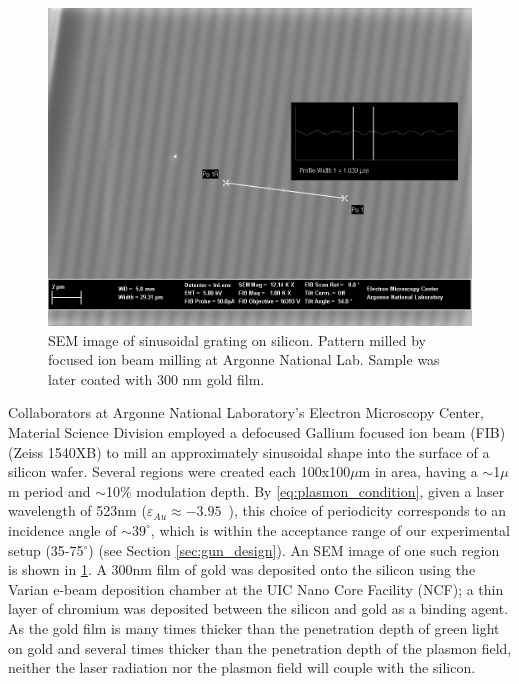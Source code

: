 \begin{figure}
  \centering
  \includegraphics{HighMagSEM.jpg}
  \caption[SEM image of sinusoidal grating on silicon]{
    SEM image of sinusoidal grating on silicon.
    Pattern milled by focused ion beam milling at Argonne National Lab.
    Sample was later coated with 300 nm gold film.
  }
  \label{fig:fib-si-sem}
\end{figure}

Collaborators at Argonne National Laboratory's Electron Microscopy Center, Material Science Division employed a defocused Gallium focused ion beam (FIB) (Zeiss 1540XB) to mill an approximately sinusoidal shape into the surface of a silicon wafer.
Several regions were created each 100x100$\mu$m in area, having a $\sim$1$\mu$m period and $\sim$10\% modulation depth.
By \ref{eq:plasmon_condition}, given a laser wavelength of 523nm ($\varepsilon_{Au} \approx -3.95$~\cite{johnson_optical_1972}), this choice of periodicity corresponds to an incidence angle of $\sim39^{\circ}$, which is within the acceptance range of our experimental setup (35-75$^{\circ}$) (see Section \ref{sec:gun_design}).
An SEM image of one such region is shown in \ref{fig:fib-si-sem}.
A 300nm film of gold was deposited onto the silicon using the Varian e-beam deposition chamber at the UIC Nano Core Facility (NCF); a thin layer of chromium was deposited between the silicon and gold as a binding agent.
As the gold film is many times thicker than the penetration depth of green light on gold and several times thicker than the penetration depth of the plasmon field, neither the laser radiation nor the plasmon field will couple with the silicon.

